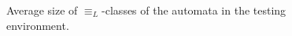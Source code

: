 \begin{figure}
\begin{minipage}{0.49\textwidth}
		\caption{Average size of $\equiv_L$-classes of the automata in the testing environment.}
		\label{fig:rawstats:rawstats_avg_langclassize}
	\end{minipage}
\end{figure}


